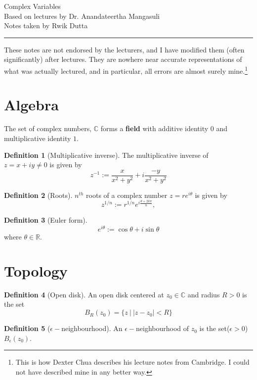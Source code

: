\documentclass[10pt, a4paper]{extarticle}
\theoremstyle{definition}
\newtheorem{defn}{Definition}
\begin{document}
\begin{center}
	\fontsize{25}{60}\selectfont Complex Variables \\
	\large Based on lectures by Dr. Anandateertha Mangasuli\\
	Notes taken by Rwik Dutta
\end{center}
\hrule
\begin{center}
	These notes are not endorsed by the lecturers, and I have modified them (often
	significantly) after lectures. They are nowhere near accurate representations of what
	was actually lectured, and in particular, all errors are almost surely mine.\footnote[1]{This is how Dexter Chua describes his lecture notes from Cambridge. I could not have described mine in any better way.}
\end{center}
\tableofcontents

\newpage

\section{Algebra}
The set of complex numbers, $\mathbb{C}$ forms a \textbf{field} with additive identity $0$ and multiplicative identity $1$.

\begin{defn}[Multiplicative inverse]
	The multiplicative inverse of $z=x+iy\neq 0$ is given by
	\[z^{-1}:=\frac{x}{x^2+y^2}+i\frac{-y}{x^2+y^2}\]
\end{defn}

\begin{defn}[Roots]
	$n^{th}$ roots of a complex number $z=re^{i\theta}$ is given by
	\[z^{1/n}:=r^{1/n}e^{i\frac{\theta+2k\pi}{n}},\tag*{($k\in \langle n\rangle)$}\]
\end{defn}

\begin{defn}[Euler form]
	\[e^{i\theta}:=\cos\theta+i\sin\theta\]
	where $\theta\in\mathbb{R}$.
\end{defn}

\section{Topology}
\begin{defn}[Open disk]
	An open disk centered at $z_0\in\mathbb{C}$ and radius $R>0$ is the set
	\[B_R(z_0)=\{z\ |\ |z-z_0|< R\}\]
\end{defn}

\begin{defn}[$\epsilon-$neighbourhood]
	An $\epsilon-$neighbourhood of $z_0$ is the set($\epsilon>0$) $B_\epsilon(z_0)$.
\end{defn}
\end{document}

